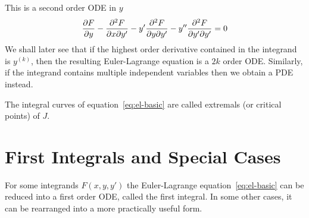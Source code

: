 \documentclass[11pt]{penrose}
\begin{document}
This is a second order ODE in $y$
\begin{equation}
    \frac{\partial F}{\partial y} - \frac{\partial^2 F}{\partial x \partial y'} - y' \frac{\partial^2 F}{\partial y \partial y'} - y'' \frac{\partial^2 F}{\partial y' \partial y'} = 0
\end{equation}
We shall later see that if the highest order derivative contained in the integrand is $y^{(k)}$, then the resulting Euler-Lagrange equation is a $2k$ order ODE. Similarly, if the integrand contains multiple independent variables then we obtain a PDE instead.

The integral curves of equation~\eqref{eq:el-basic} are called extremals (or critical points) of $J$.

\section{First Integrals and Special Cases}
For some integrands $F(x,y,y')$ the Euler-Lagrange equation~\eqref{eq:el-basic} can be reduced into a first order ODE, called the first integral. In some other cases, it can be rearranged into a more practically useful form.
\end{document}
